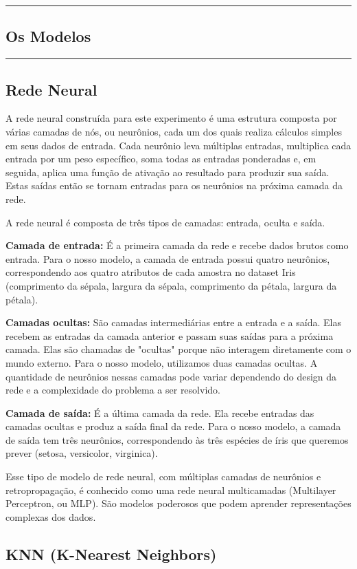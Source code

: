 {\color{gray}\hrule}
\begin{center}
\section{Os Modelos}
\end{center}
{\color{gray}\hrule}
\begin{multicols}{2}
\subsection{Rede Neural}
A rede neural construída para este experimento é uma estrutura composta por várias camadas de nós, ou neurônios, cada um dos quais realiza cálculos simples em seus dados de entrada. Cada neurônio leva múltiplas entradas, multiplica cada entrada por um peso específico, soma todas as entradas ponderadas e, em seguida, aplica uma função de ativação ao resultado para produzir sua saída. Estas saídas então se tornam entradas para os neurônios na próxima camada da rede.

A rede neural é composta de três tipos de camadas: entrada, oculta e saída.

\textbf{Camada de entrada:} É a primeira camada da rede e recebe dados brutos como entrada. Para o nosso modelo, a camada de entrada possui quatro neurônios, correspondendo aos quatro atributos de cada amostra no dataset Iris (comprimento da sépala, largura da sépala, comprimento da pétala, largura da pétala).

\textbf{Camadas ocultas:} São camadas intermediárias entre a entrada e a saída. Elas recebem as entradas da camada anterior e passam suas saídas para a próxima camada. Elas são chamadas de "ocultas" porque não interagem diretamente com o mundo externo. Para o nosso modelo, utilizamos duas camadas ocultas. A quantidade de neurônios nessas camadas pode variar dependendo do design da rede e a complexidade do problema a ser resolvido.

\textbf{Camada de saída:} É a última camada da rede. Ela recebe entradas das camadas ocultas e produz a saída final da rede. Para o nosso modelo, a camada de saída tem três neurônios, correspondendo às três espécies de íris que queremos prever (setosa, versicolor, virginica).

Esse tipo de modelo de rede neural, com múltiplas camadas de neurônios e retropropagação, é conhecido como uma rede neural multicamadas (Multilayer Perceptron, ou MLP). São modelos poderosos que podem aprender representações complexas dos dados.
\subsection{KNN (K-Nearest Neighbors)}


\end{multicols}
